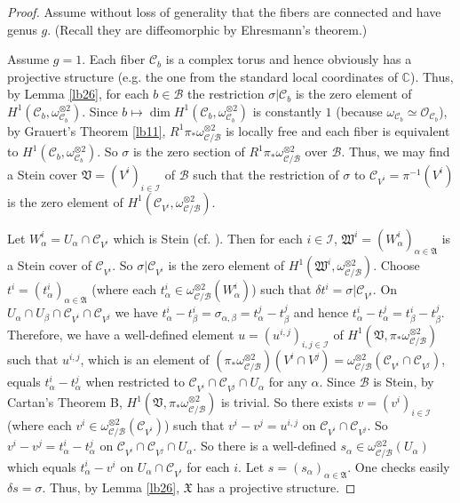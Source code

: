\documentclass[11pt,b5paper,notitlepage]{article}
\theoremstyle{definition}
\theoremstyle{plain}
\newcommand{\fk}{\mathfrak}
\newcommand{\mc}{\mathcal}
\newcommand{\scr}{\mathscr}
\newcommand{\mbb}{\mathbb}
\numberwithin{equation}{section}
\begin{document}
\begin{proof}
Assume without loss of generality that the fibers are connected and have genus $g$. (Recall they are diffeomorphic by Ehresmann's theorem.) 
	
Assume $g=1$. Each fiber $\mc C_b$ is a complex torus and hence obviously has a projective structure (e.g. the one from the standard local coordinates of $\mbb C$). Thus, by Lemma \ref{lb26}, for each $b\in\mc B$ the restriction $\sigma|\mc C_b$ is the zero element of $H^1(\mc C_b,\omega_{\mc C_b}^{\otimes 2})$. Since $b\mapsto \dim H^1(\mc C_b,\omega_{\mc C_b}^{\otimes 2})$ is constantly $1$ (because $\omega_{\mc C_b}\simeq \scr O_{\mc C_b}$), by Grauert's Theorem \ref{lb11}, $R^1\pi_*\omega_{\mc C/\mc B}^{\otimes 2}$ is locally free and each fiber is equivalent to $H^1(\mc C_b,\omega_{\mc C_b}^{\otimes 2})$. So $\sigma$ is the zero section of $R^1\pi_*\omega_{\mc C/\mc B}^{\otimes 2}$ over $\mc B$. Thus, we may find a Stein cover $\fk V=(V^i)_{i\in\mc I}$ of $\mc B$ such that  the restriction of $\sigma$ to $\mc C_{V^i}=\pi^{-1}(V^i)$ is the zero element of $H^1(\mc C_{V^i},\omega_{\mc C/\mc B}^{\otimes 2})$.
	
Let $W_\alpha^i=U_\alpha\cap \mc C_{V^i}$ which is Stein (cf. \cite[Sec. 1.4.4]{GR84}). Then for each $i\in\mc I$, $\fk W^i=(W_\alpha^i)_{\alpha\in\fk A}$ is a Stein cover of $\mc C_{V^i}$.  So $\sigma|\mc C_{V^i}$ is the zero element of  $H^1(\fk W^i,\omega_{\mc C/\mc B}^{\otimes 2})$. Choose $t^i=(t^i_\alpha)_{\alpha\in\fk A}$ (where each $t^i_\alpha\in\omega_{\mc C/\mc B}^{\otimes 2}(W_\alpha^i)$) such that $\delta t^i=\sigma|\mc C_{V^i}$. On $U_\alpha\cap U_\beta\cap \mc C_{V^i}\cap \mc C_{V^j}$ we have $t^i_\alpha-t^i_\beta=\sigma_{\alpha,\beta}=t^j_\alpha-t^j_\beta$ and hence $t^i_\alpha-t^j_\alpha=t^i_\beta-t^j_\beta$. Therefore, we have a well-defined element $u=(u^{i,j})_{i,j\in\mc I}$ of $H^1(\fk V,\pi_*\omega_{\mc C/\mc B}^{\otimes 2})$ such that $u^{i,j}$, which is an element of $(\pi_*\omega_{\mc C/\mc B}^{\otimes 2})(V^i\cap V^j)=\omega_{\mc C/\mc B}^{\otimes 2}(\mc C_{V^i}\cap \mc C_{V^j})$, equals $t^i_\alpha-t^j_\alpha$ when restricted to $\mc C_{V^i}\cap \mc C_{V^j}\cap U_\alpha$ for  any $\alpha$. Since $\mc B$ is Stein, by Cartan's Theorem B,  $H^1(\fk V,\pi_*\omega_{\mc C/\mc B}^{\otimes 2})$ is trivial. So there exists $v=(v^i)_{i\in\mc I}$ (where each $v^i\in \omega_{\mc C/\mc B}^{\otimes 2}(\mc C_{V^i})$) such that $v^i-v^j=u^{i,j}$ on $\mc C_{V^i}\cap \mc C_{V^j}$. So $v^i-v^j=t^i_\alpha-t^j_\alpha$ on $\mc C_{V^i}\cap \mc C_{V^j}\cap U_\alpha$. So there is a well-defined $s_\alpha\in\omega_{\mc C/\mc B}^{\otimes 2}(U_\alpha)$ which equals $t^i_\alpha-v^i$ on  $U_\alpha\cap \mc C_{V^i}$ for each $i$. Let $s=(s_\alpha)_{\alpha\in\fk A}$. One checks easily $\delta s=\sigma$. Thus, by Lemma \ref{lb26}, $\fk X$ has a projective structure.
	

\end{proof}
\end{document}
